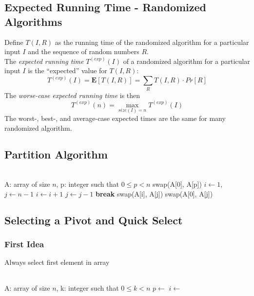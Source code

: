 \documentclass[12pt]{article}
\theoremstyle{definition}
\begin{document}
\subsection{Expected Running Time - Randomized Algorithms}
Define $T(I, R)$ as the running time of the randomized algorithm for a particular input $I$ and the sequence of random numbers $R$. \\
The \emph{expected running time} $T^{(exp)}(I)$ of a randomized algorithm for a particular input $I$ is the ``expected'' value for $T(I,R)$:
$$T^{(exp)}(I) = \textbf{E}[T(I,R)] = \sum_{R}T(I,R) \cdot Pr[R]$$
The \emph{worse-case expected running time} is then
$$T^{(exp)}(n) = \underset{size(I) = n}{\max} T^{(exp)}(I)$$
The worst-, best-, and average-case expected times are the same for many randomized algorithm.

\subsection{Partition Algorithm}
\begin{algorithmic}
   \\
  A: array of size $n$, p: integer such that $0 \leq p < n$
  \State swap(A[0], A[p])
  \State $i \leftarrow 1$, $j \leftarrow n - 1$
  \Loop
      \State $i \leftarrow i + 1$
    \EndWhile
      \State $j \leftarrow j - 1$
    \EndWhile
      \State \textbf{break}
    \Else
      \State swap(A[i], A[j])
    \EndIf
  \EndLoop
  \State swap(A[0], A[j])
  \State {}
  \EndFunction
\end{algorithmic}

\subsection{Selecting a Pivot and Quick Select}
\subsubsection{First Idea}  \label{first-pivot}
Always select first element in array
\begin{algorithmic}
  \State {}
  \EndFunction
\end{algorithmic}

\begin{algorithmic}
   \\
  A: array of size $n$, k: integer such that $0 \leq k < n$
  \State $p \leftarrow$ 
  \State $i \leftarrow$ 
    \State {}
    \State {}
    \State {}
  \EndIf
  \EndFunction
\end{algorithmic}
\end{document}

